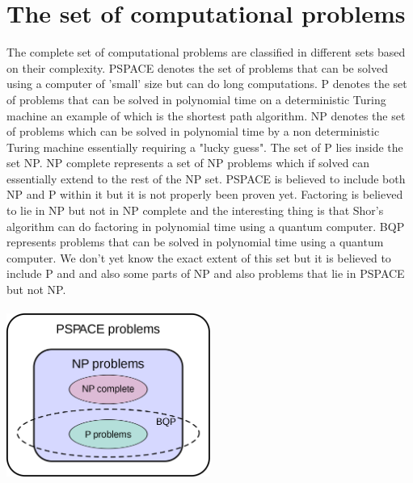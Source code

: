 \documentclass{report}
\begin{document}
\section{The set of computational problems}
The complete set of computational problems are classified in different sets based on their complexity. PSPACE denotes the set of problems that can be solved using a computer of 'small' size but can do long computations. P denotes the set of problems that can be solved in polynomial time on a deterministic Turing machine an example of which is the shortest path algorithm. NP denotes the set of problems which can be solved in polynomial time by a non deterministic Turing machine essentially requiring a "lucky guess". The set of P lies inside the set NP. NP complete represents a set of NP problems which if solved can essentially extend to the rest of the NP set. PSPACE is believed to include both NP and P within it but it is not properly been proven yet. Factoring is believed to lie in NP but not in NP complete and the interesting thing is that Shor's algorithm can do factoring in polynomial time using a quantum computer. BQP represents problems that can be solved in polynomial time using a quantum computer. We don't yet know the exact extent of this set but it is believed to include P and and also some parts of NP and also problems that lie in PSPACE but not NP.\\\\
\includegraphics[width = 0.5\textwidth, center]{images/Venn diagram p space.png}
\end{document}
